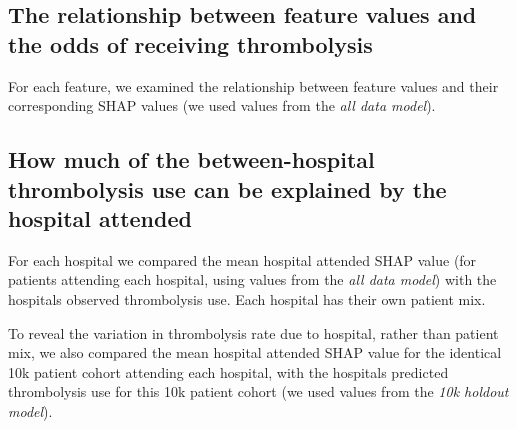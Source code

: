 


\subsection{The relationship between feature values and the odds of receiving thrombolysis}
For each feature, we examined the relationship between feature values and their corresponding SHAP values (we used values from the \emph{all data model}).

\subsection{How much of the between-hospital thrombolysis use can be explained by the hospital attended}%

For each hospital we compared the mean hospital attended SHAP value (for patients attending each hospital, using values from the \emph{all data model}) with the hospitals observed thrombolysis use. Each hospital has their own patient mix.

To reveal the variation in thrombolysis rate due to hospital, rather than patient mix, we also compared the mean hospital attended SHAP value for the identical 10k patient cohort attending each hospital, with the hospitals predicted thrombolysis use for this 10k patient cohort (we used values from the \emph{10k holdout model}).

